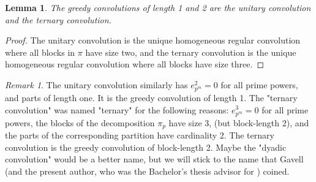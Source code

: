 \documentclass[12pt]{article}
\theoremstyle{definition}
\theoremstyle{remark}
\newtheorem{remark}{Remark}
\theoremstyle{plain}
\newtheorem{lemma}{Lemma}
\begin{document}
\begin{lemma}
The greedy convolutions of length 1 and 2 are  the unitary convolution and the ternary convolution.
\label{org97675d4}
\end{lemma}
\begin{proof}
The unitary convolution is the unique homogeneous regular convolution where all blocks in \(\pi\) have size two,
and the ternary convolution is the unique homogeneous regular convolution where all blocks have size three.
\end{proof}

\begin{remark}
The unitary convolution similarly has \(e_{p^{m}}^{2}=0\) for all prime powers,
and parts of length one. It is the greedy convolution of length 1.
The "ternary convolution" was named "ternary" for the following reasons: \(e_{p^{m}}^{3}=0\) for all prime powers,
the blocks of the decomposition \(\pi_{p}\) have size 3, (but block-length 2),
and the parts of the corresponding partition have cardinality 2.
The ternary convolution is the greedy convolution of block-length 2. Maybe the "dyadic convolution" would
be a better name, but we will stick to the name that Gavell (and the present author, who
was the Bachelor's thesis advisor for \cite{Gavell:Regular}) coined.
\end{remark}
\end{document}
